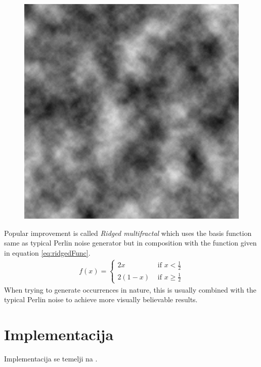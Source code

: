 \documentclass[journal]{IEEEtran}
\begin{document}
\begin{figure}[H]
	\centering
	\includegraphics[width=.6\linewidth]{perlinNoise.png}
	\label{fig:perlinNoise}
\end{figure}
Popular improvement is called \textit{Ridged multifractal} which uses the basis function same as typical Perlin noise generator but in composition with the function given in equation \ref{eq:ridgedFunc}.
\begin{gather}
\label{eq:ridgedFunc}
f(x)=\begin{cases}
2x & \text{ if } x < \frac{1}{2} \\ 
2(1-x) & \text{ if } x \geq \frac{1}{2}
\end{cases}
\end{gather}
When trying to generate occurrences in nature, this is usually combined with the typical Perlin noise to achieve more visually believable results.

\section{Implementacija}
Implementacija se temelji na \cite{giraffe}.
\end{document}
